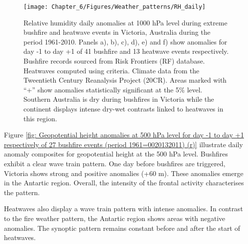 \begin{figure}[h]
\noindent \begin{centering}
\texttt{[image: Chapter\_6/Figures/Weather\_patterns/RH\_daily]}
\par\end{centering}

\caption[Relative humidity daily anomalies at 1000 hPa level during extreme
bushfire and heatwave events in Victoria, Australia during the period
1961-2010]{Relative humidity daily anomalies at 1000 hPa level during extreme
bushfire and heatwave events in Victoria, Australia during the period
1961-2010. Panels a), b), c), d), e) and f) show anomalies for day
-1 to day +1 of 41 bushfire and 13 heatwave events respectively. Bushfire
records sourced from Risk Frontiers (RF) database. Heatwaves computed
using \citet{Pezza2012} criteria. Climate data from the Tweentieth
Century Reanalysis Project (20CR). Areas marked with ``+'' show
anomalies statistically significant at the 5\% level. Southern Australia
is dry during bushfires in Victoria while the continent displays intense
dry-wet contrasts linked to heatwaves in this region. \label{fig:Relative humidity anomalies at 1000 hPa level for day -1 to day +1 respectively of 27 bushfire events (period 1961=0020132011) (r)}}
\end{figure}


Figure \ref{fig: Geopotential height anomalies at 500 hPa level for day -1 to day +1 respectively of 27 bushfire events (period 1961=0020132011) (r)}
illustrate daily anomaly composites for geopotential height at the
500 hPa level. Bushfires exhibit a clear wave train pattern. One day
before bushfires are triggered, Victoria shows strong and positive
anomalies (+60 m). These anomalies emerge in the Antartic region.
Overall, the intensity of the frontal activity characterises the pattern. 

Heatwaves also display a wave train pattern with intense anomalies.
In contrast to the fire weather pattern, the Antartic region shows
areas with negative anomalies. The synoptic pattern remains constant
before and after the start of heatwaves. 

